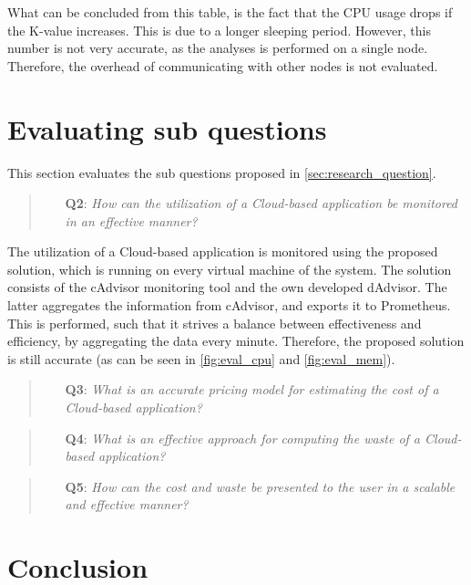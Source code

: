 \noindent
What can be concluded from this table, is the fact that the CPU usage drops if the K-value increases. This is due to a longer sleeping period. However, this number is not very accurate, as the analyses is performed on a single node. Therefore, the overhead of communicating with other nodes is not evaluated.

\section{Evaluating sub questions}
This section evaluates the sub questions proposed in \autoref{sec:research_question}.

\begin{quote}
    \begin{itemize}
        \item[\textbf{Q2}: ]\textit{How can the utilization of a Cloud-based application be monitored in an effective manner?}
    \end{itemize}
\end{quote}

\noindent
The utilization of a Cloud-based application is monitored using the proposed solution, which is running on every virtual machine of the system. The solution consists of the cAdvisor monitoring tool and the own developed dAdvisor. The latter aggregates the information from cAdvisor, and exports it to Prometheus. This is performed, such that it strives a balance between effectiveness and efficiency, by aggregating the data every minute. Therefore, the proposed solution is still accurate (as can be seen in \autoref{fig:eval_cpu} and \autoref{fig:eval_mem}).


\begin{quote}
    \begin{itemize}
        \item[\textbf{Q3}: ]\textit{What is an accurate pricing model for estimating the cost of a Cloud-based application?}
    \end{itemize}
\end{quote}


\begin{quote}
    \begin{itemize}
        \item[\textbf{Q4}: ]\textit{What is an effective approach for computing the waste of a Cloud-based application?}
    \end{itemize}
\end{quote}


\begin{quote}
    \begin{itemize}
        \item[\textbf{Q5}: ]\textit{How can the cost and waste be presented to the user in a scalable and effective manner?}
    \end{itemize}
\end{quote}




\section{Conclusion}
